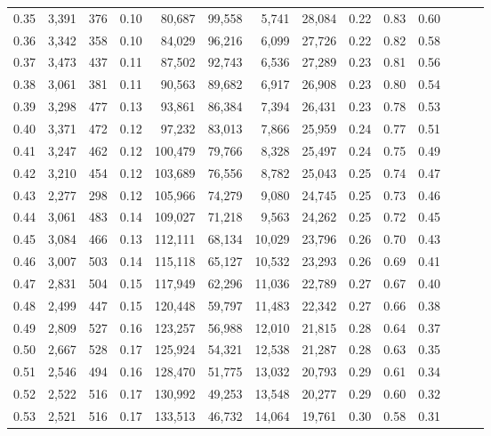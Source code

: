 \begin{tabular}{rrrrrrrrrrrrrr}
0.35 &  3,391 &  376 &  0.10 &   80,687 &   99,558 &   5,741 &  28,084 &  0.22 &  0.83 &      0.60 \\
0.36 &  3,342 &  358 &  0.10 &   84,029 &   96,216 &   6,099 &  27,726 &  0.22 &  0.82 &      0.58 \\
0.37 &  3,473 &  437 &  0.11 &   87,502 &   92,743 &   6,536 &  27,289 &  0.23 &  0.81 &      0.56 \\
0.38 &  3,061 &  381 &  0.11 &   90,563 &   89,682 &   6,917 &  26,908 &  0.23 &  0.80 &      0.54 \\
0.39 &  3,298 &  477 &  0.13 &   93,861 &   86,384 &   7,394 &  26,431 &  0.23 &  0.78 &      0.53 \\
0.40 &  3,371 &  472 &  0.12 &   97,232 &   83,013 &   7,866 &  25,959 &  0.24 &  0.77 &      0.51 \\
0.41 &  3,247 &  462 &  0.12 &  100,479 &   79,766 &   8,328 &  25,497 &  0.24 &  0.75 &      0.49 \\
0.42 &  3,210 &  454 &  0.12 &  103,689 &   76,556 &   8,782 &  25,043 &  0.25 &  0.74 &      0.47 \\
0.43 &  2,277 &  298 &  0.12 &  105,966 &   74,279 &   9,080 &  24,745 &  0.25 &  0.73 &      0.46 \\
0.44 &  3,061 &  483 &  0.14 &  109,027 &   71,218 &   9,563 &  24,262 &  0.25 &  0.72 &      0.45 \\
0.45 &  3,084 &  466 &  0.13 &  112,111 &   68,134 &  10,029 &  23,796 &  0.26 &  0.70 &      0.43 \\
0.46 &  3,007 &  503 &  0.14 &  115,118 &   65,127 &  10,532 &  23,293 &  0.26 &  0.69 &      0.41 \\
0.47 &  2,831 &  504 &  0.15 &  117,949 &   62,296 &  11,036 &  22,789 &  0.27 &  0.67 &      0.40 \\
0.48 &  2,499 &  447 &  0.15 &  120,448 &   59,797 &  11,483 &  22,342 &  0.27 &  0.66 &      0.38 \\
0.49 &  2,809 &  527 &  0.16 &  123,257 &   56,988 &  12,010 &  21,815 &  0.28 &  0.64 &      0.37 \\
0.50 &  2,667 &  528 &  0.17 &  125,924 &   54,321 &  12,538 &  21,287 &  0.28 &  0.63 &      0.35 \\
0.51 &  2,546 &  494 &  0.16 &  128,470 &   51,775 &  13,032 &  20,793 &  0.29 &  0.61 &      0.34 \\
0.52 &  2,522 &  516 &  0.17 &  130,992 &   49,253 &  13,548 &  20,277 &  0.29 &  0.60 &      0.32 \\
0.53 &  2,521 &  516 &  0.17 &  133,513 &   46,732 &  14,064 &  19,761 &  0.30 &  0.58 &      0.31 \\

\end{tabular}
